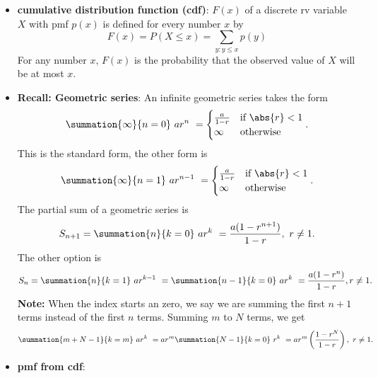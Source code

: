 \documentclass{report}
\begin{document}
\begin{itemize}
    \item \textbf{cumulative distribution function (cdf)}: \( F(x) \) of a discrete rv variable \( X \) with pmf \( p(x) \) is defined for every number \( x \) by
        \[
            F(x) = P(X \leq x) = \sum_{y: y \leq x} p(y) \tag{3.3}
        \]
        For any number \( x \), \( F(x) \) is the probability that the observed value of \( X \) will be at most \( x \).
    \item \textbf{Recall: Geometric series}:
        \bigbreak \noindent 
        An infinite geometric series takes the form
        \begin{align*}
            \summation{\infty}{n=0}\ ar^{n}\ = 
            \begin{cases}
                \frac{a}{1-r} & \text{if } \abs{r} < 1 \\
                \infty & \text{otherwise}
            \end{cases}
        .\end{align*}
        This is the standard form, the other form is 
        \begin{align*}
            \summation{\infty}{n=1}\ ar^{n-1}\ =
            \begin{cases}
                 \frac{a}{1-r} & \text{if } \abs{r} < 1 \\
                \infty & \text{otherwise}
            \end{cases}
        .\end{align*}
        \bigbreak \noindent 
        The partial sum of a geometric series is 
        \begin{align*}
            S_{n+1} = \summation{n}{k=0}\ ar^{k}\ = \frac{a(1-r^{n+1})}{1-r},\ r\neq 1
        .\end{align*}
        \bigbreak \noindent 
        The other option is 
        \begin{align*}
            S_{n} = \summation{n}{k=1}\ ar^{k-1}\ = \summation{n-1}{k=0}\ ar^{k}\ = \frac{a(1-r^{n})}{1-r}, r\neq 1
        .\end{align*}
        \bigbreak \noindent 
        \textbf{Note:} When the index starts an zero, we say we are summing the first $n+1$ terms instead of the first $n$ terms.
        \bigbreak \noindent 
        Summing $m$ to $N$ terms, we get
        \begin{align*}
            \summation{m+N-1}{k=m}\ ar^{k}\ = ar^{m}\summation{N-1}{k=0}\ r^{k}\ = ar^{m}\left(\frac{1-r^{N}}{1-r}\right),\ r\neq 1
        .\end{align*}
    \item \textbf{pmf from cdf}:

\end{itemize}
\end{document}
